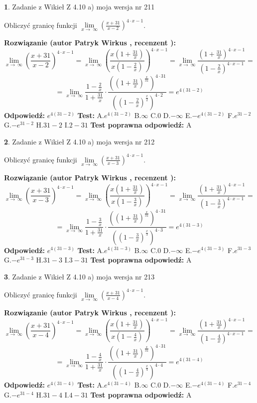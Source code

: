 \documentclass[12pt, a4paper]{article}
\theoremstyle{definition} %
\newtheorem{zad}{}
\newcommand{\zadStart}[1]{\begin{zad}#1\newline}
\newcommand{\zadStop}{\end{zad}}
\newcommand{\rozwStart}[2]{\noindent \textbf{Rozwiązanie (autor #1 , recenzent #2): }\newline}
\newcommand{\rozwStop}{\newline}
\newcommand{\odpStart}{\noindent \textbf{Odpowiedź:}\newline}
\newcommand{\odpStop}{\newline}
\newcommand{\testStart}{\noindent \textbf{Test:}\newline}
\newcommand{\testStop}{\newline}
\newcommand{\kluczStart}{\noindent \textbf{Test poprawna odpowiedź:}\newline}
\newcommand{\kluczStop}{\newline}
\begin{document}
\zadStart{Zadanie z Wikieł Z 4.10 a) moja wersja nr 211}


Obliczyć granicę funkcji  $\lim\limits_{x\to\ \infty}(\frac{x+31}{x-2})^{4\cdot x-1}$.
\zadStop
\rozwStart{Patryk Wirkus}{}
$$\lim\limits_{x\to\ \infty}(\frac{x+31}{x-2})^{4\cdot x-1} = \lim\limits_{x\to\ \infty}(\frac{x(1+\frac{31}{x})}{x(1-\frac{2}{x})})^{4\cdot x-1}=\lim\limits_{x\to\ \infty}\frac{(1+\frac{31}{x})^{4\cdot x-1}}{(1-\frac{2}{x})^{4\cdot x-1}}=$$
$$=\lim\limits_{x\to\ \infty}\frac{1-\frac{2}{x}}{1+\frac{31}{x}}\cdot\frac{((1+\frac{31}{x})^{\frac{x}{31}})^{4\cdot31}}{((1-\frac{2}{x})^{\frac{x}{2}})^{4\cdot2}}=e^{4(31-2)}$$
\rozwStop
\odpStart
$e^{4(31-2)}$
\odpStop
\testStart
A.$e^{4(31-2)}$ B.$\infty$ C.$0$ D.$-\infty$ E.$-e^{4(31-2)}$
F.$e^{31-2}$ G.$-e^{31-2}$
H.$31-2$
I.$2-31$
\testStop
\kluczStart
A
\kluczStop



\zadStart{Zadanie z Wikieł Z 4.10 a) moja wersja nr 212}


Obliczyć granicę funkcji  $\lim\limits_{x\to\ \infty}(\frac{x+31}{x-3})^{4\cdot x-1}$.
\zadStop
\rozwStart{Patryk Wirkus}{}
$$\lim\limits_{x\to\ \infty}(\frac{x+31}{x-3})^{4\cdot x-1} = \lim\limits_{x\to\ \infty}(\frac{x(1+\frac{31}{x})}{x(1-\frac{3}{x})})^{4\cdot x-1}=\lim\limits_{x\to\ \infty}\frac{(1+\frac{31}{x})^{4\cdot x-1}}{(1-\frac{3}{x})^{4\cdot x-1}}=$$
$$=\lim\limits_{x\to\ \infty}\frac{1-\frac{3}{x}}{1+\frac{31}{x}}\cdot\frac{((1+\frac{31}{x})^{\frac{x}{31}})^{4\cdot31}}{((1-\frac{3}{x})^{\frac{x}{3}})^{4\cdot3}}=e^{4(31-3)}$$
\rozwStop
\odpStart
$e^{4(31-3)}$
\odpStop
\testStart
A.$e^{4(31-3)}$ B.$\infty$ C.$0$ D.$-\infty$ E.$-e^{4(31-3)}$
F.$e^{31-3}$ G.$-e^{31-3}$
H.$31-3$
I.$3-31$
\testStop
\kluczStart
A
\kluczStop



\zadStart{Zadanie z Wikieł Z 4.10 a) moja wersja nr 213}


Obliczyć granicę funkcji  $\lim\limits_{x\to\ \infty}(\frac{x+31}{x-4})^{4\cdot x-1}$.
\zadStop
\rozwStart{Patryk Wirkus}{}
$$\lim\limits_{x\to\ \infty}(\frac{x+31}{x-4})^{4\cdot x-1} = \lim\limits_{x\to\ \infty}(\frac{x(1+\frac{31}{x})}{x(1-\frac{4}{x})})^{4\cdot x-1}=\lim\limits_{x\to\ \infty}\frac{(1+\frac{31}{x})^{4\cdot x-1}}{(1-\frac{4}{x})^{4\cdot x-1}}=$$
$$=\lim\limits_{x\to\ \infty}\frac{1-\frac{4}{x}}{1+\frac{31}{x}}\cdot\frac{((1+\frac{31}{x})^{\frac{x}{31}})^{4\cdot31}}{((1-\frac{4}{x})^{\frac{x}{4}})^{4\cdot4}}=e^{4(31-4)}$$
\rozwStop
\odpStart
$e^{4(31-4)}$
\odpStop
\testStart
A.$e^{4(31-4)}$ B.$\infty$ C.$0$ D.$-\infty$ E.$-e^{4(31-4)}$
F.$e^{31-4}$ G.$-e^{31-4}$
H.$31-4$
I.$4-31$
\testStop
\kluczStart
A
\kluczStop
\end{document}
